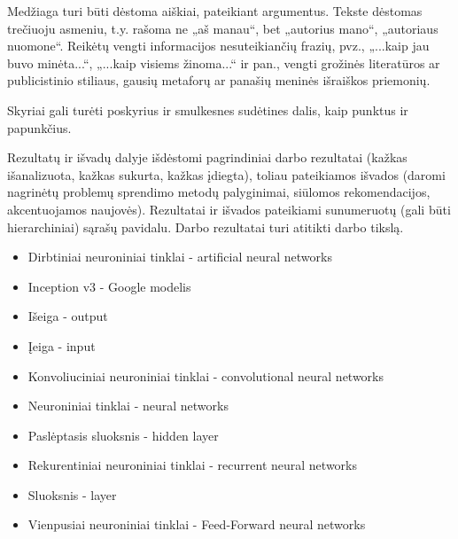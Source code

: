 \documentclass{VUMIFPSbakalaurinis}
\begin{document}
Medžiaga turi būti dėstoma aiškiai, pateikiant argumentus. Tekste dėstomas
trečiuoju asmeniu, t.y. rašoma ne „aš manau“, bet „autorius mano“, „autoriaus
nuomone“. Reikėtų vengti informacijos nesuteikiančių frazių, pvz., „...kaip jau
buvo minėta...“, „...kaip visiems žinoma...“ ir pan., vengti grožinės
literatūros ar publicistinio stiliaus, gausių metaforų ar panašių meninės
išraiškos priemonių.

Skyriai gali turėti poskyrius ir smulkesnes sudėtines dalis, kaip punktus ir
papunkčius.


Rezultatų ir išvadų dalyje išdėstomi pagrindiniai darbo rezultatai (kažkas
išanalizuota, kažkas sukurta, kažkas įdiegta), toliau pateikiamos išvados
(daromi nagrinėtų problemų sprendimo metodų palyginimai, siūlomos
rekomendacijos, akcentuojamos naujovės). Rezultatai ir išvados pateikiami
sunumeruotų (gali būti hierarchiniai) sąrašų pavidalu. Darbo rezultatai turi
atitikti darbo tikslą.

\printbibliography[heading=bibintoc]  %


\begin{itemize}
	\item Dirbtiniai neuroniniai tinklai - artificial neural networks
	\item Inception v3 - Google modelis
	\item Išeiga - output
	\item Įeiga - input
	\item Konvoliuciniai neuroniniai tinklai - convolutional neural networks
	\item Neuroniniai tinklai - neural networks
	\item Paslėptasis sluoksnis - hidden layer
	\item Rekurentiniai neuroniniai tinklai - recurrent neural networks
	\item Sluoksnis - layer
	\item Vienpusiai neuroniniai tinklai - Feed-Forward neural networks
\end{itemize}
\end{document}
